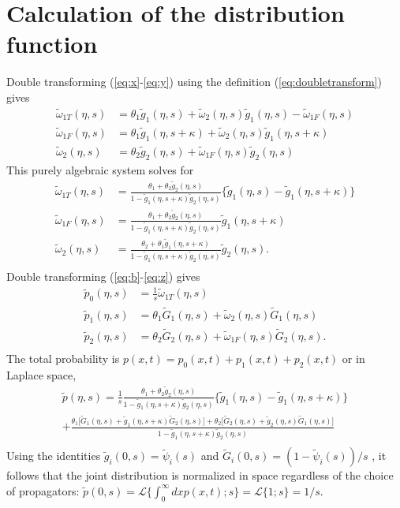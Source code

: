 \documentclass[]{agujournal2018}
\newcommand\tom{\tilde{\omega}}
\newcommand\tg{\tilde{g}}
\newcommand\tp{\tilde{p}}
\newcommand\tG{\tilde{G}}
\begin{document}
\section{Calculation of the distribution function}
\label{sec:appendixA}
Double transforming (\ref{eq:x}-\ref{eq:y}) using the definition (\ref{eq:doubletransform}) gives
\begin{align}
\tom_{1T}(\eta,s) &= \theta_1 \tg_1(\eta,s) + \tom_2(\eta,s)\tg_1(\eta,s)-\tom_{1F}(\eta,s) \\
\tom_{1F}(\eta,s) &= \theta_1\tg_1(\eta,s+\kappa) + \tom_2(\eta,s)\tg_1(\eta,s+\kappa)\\
\tom_2(\eta,s) &= \theta_2 \tg_2(\eta,s) + \tom_{1F}(\eta,s)\tg_2(\eta,s)
\end{align}
This purely algebraic system solves for 
\begin{align}
\tom_{1T}(\eta,s) &= \frac{\theta_1 + \theta_2 \tg_2(\eta,s)}{1-\tg_1(\eta,s+\kappa)\tg_2(\eta,s)}\big\{\tg_1(\eta,s)-\tg_1(\eta,s+\kappa) \big\} \\
\tom_{1F}(\eta,s) &= \frac{\theta_1 + \theta_2 \tg_2(\eta,s)}{1-\tg_1(\eta,s+\kappa)\tg_2(\eta,s)}\tg_1(\eta,s+\kappa)\\
\tom_{2}(\eta,s) &= \frac{\theta_2 + \theta_1 \tg_1(\eta,s+\kappa)}{1-\tg_1(\eta,s+\kappa)\tg_2(\eta,s)}\tg_2(\eta,s).\\
\end{align}
Double transforming (\ref{eq:b}-\ref{eq:z}) gives
\begin{align}
\tp_0(\eta,s) &= \frac{1}{s}\tom_{1T}(\eta,s)\\
\tp_1(\eta,s) &= \theta_1 \tG_1(\eta,s) + \tom_2(\eta,s) \tG_1(\eta,s) \\
\tp_2(\eta,s) &= \theta_2 \tG_2(\eta,s) + \tom_{1F}(\eta,s)\tG_2(\eta,s).\\
\end{align}
The total probability is $p(x,t) = p_0(x,t) + p_1(x,t) + p_2(x,t)$ or in Laplace space, 
\begin{multline}
\tp(\eta,s) = \frac{1}{s}\frac{\theta_1 + \theta_2 \tg_2(\eta,s)}{1-\tg_1(\eta,s+\kappa)\tg_2(\eta,s)}\big\{\tg_1(\eta,s)-\tg_1(\eta,s+\kappa) \big\} \\
+\frac{\theta_1\big[\tG_1(\eta,s) + \tg_1(\eta,s+\kappa)\tG_2(\eta,s)\big]+ \theta_2\big[\tG_2(\eta,s) + \tg_2(\eta,s)\tG_1(\eta,s)\big]}{1-\tg_1(\eta,s+\kappa)\tg_2(\eta,s)} \\
\label{eq:lap}
\end{multline}
Using the identities $\tg_i(0,s) = \tilde{\psi}_i(s)$ and $\tG_i(0,s) = (1-\tilde{\psi}_i(s))/s$ \citep[e.g.][]{Weiss1994}, it follows that the joint distribution is normalized in space regardless of the choice of propagators: $\tp(0,s) = \mathcal{L}\{\int_0^\infty dx p(x,t);s\} = \mathcal{L}\{1;s\} = 1/s$.
\end{document}
